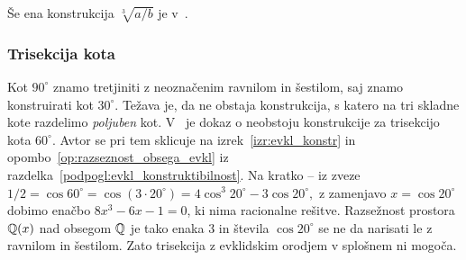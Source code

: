 Še ena konstrukcija $\sqrt[3]{a/b}$ je v~\cite[str.\ 366--367]{geret1995}.



\subsubsection{Trisekcija kota}
\label{podpogl:trisekcija}

Kot $90^\circ$ znamo tretjiniti z neoznačenim ravnilom in šestilom, saj znamo konstruirati kot $30^\circ$. Težava je, da ne obstaja konstrukcija, s katero na tri skladne kote razdelimo \emph{poljuben} kot. V~\cite[str.\ 77--78]{jerman1998} je dokaz o neobstoju konstrukcije za trisekcijo kota $60^\circ$. Avtor se pri tem sklicuje na izrek~\ref{izr:evkl_konstr} in opombo~\ref{op:razseznost_obsega_evkl} iz razdelka~\ref{podpogl:evkl_konstruktibilnost}. Na kratko -- iz zveze $ 1/2 = \cos 60^\circ = \cos(3 \cdot 20^\circ) = 4 \cos^3 20^\circ - 3 \cos 20^\circ, $ z zamenjavo $x = \cos 20^\circ$ dobimo enačbo $8 x^3 - 6x - 1 = 0$, ki nima racionalne rešitve. Razsežnost prostora $\mathbb Q(x)$ nad obsegom $\mathbb Q$ je tako enaka $3$ in števila $ \cos 20^\circ $ se ne da narisati le z ravnilom in šestilom. Zato trisekcija z evklidskim orodjem v splošnem ni mogoča.





